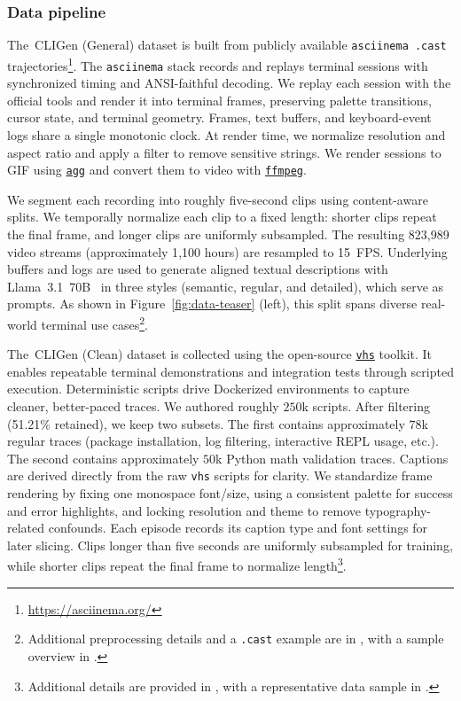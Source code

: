 \subsubsection{Data pipeline}

The \cligenGeneralLogo{}\,CLIGen (General) dataset is built from publicly available \texttt{asciinema .cast} trajectories\footnote{\url{https://asciinema.org/}}.
The \texttt{asciinema} stack records and replays terminal sessions with synchronized timing and ANSI-faithful decoding.
We replay each session with the official tools and render it into terminal frames, preserving palette transitions, cursor state, and terminal geometry.
Frames, text buffers, and keyboard-event logs share a single monotonic clock.
At render time, we normalize resolution and aspect ratio and apply a filter to remove sensitive strings.
We render sessions to GIF using \href{https://github.com/asciinema/agg}{\texttt{agg}} and convert them to video with \href{https://github.com/FFmpeg/FFmpeg}{\texttt{ffmpeg}}.

We segment each recording into roughly five-second clips using content-aware splits. 
We temporally normalize each clip to a fixed length: shorter clips repeat the final frame, and longer clips are uniformly subsampled. 
The resulting 823{,}989 video streams (approximately 1{,}100 hours) are resampled to 15~FPS.
Underlying buffers and logs are used to generate aligned textual descriptions with Llama~3.1~70B~\citep{dubey2024llama} in three styles (semantic, regular, and detailed), which serve as prompts.
As shown in Figure~\ref{fig:data-teaser} (left), this split spans diverse real-world terminal use cases\footnote{Additional preprocessing details and a \texttt{.cast} example are in , with a sample overview in .}.

The \cligenCleanLogo{}\,CLIGen (Clean) dataset is collected using the open-source \href{https://github.com/charmbracelet/vhs}{\texttt{vhs}} toolkit.
It enables repeatable terminal demonstrations and integration tests through scripted execution.
Deterministic scripts drive Dockerized environments to capture cleaner, better-paced traces.
We authored roughly $250$k scripts.
After filtering (51.21\% retained), we keep two subsets.
The first contains approximately $78$k regular traces (package installation, log filtering, interactive REPL usage, etc.).
The second contains approximately $50$k Python math validation traces.
Captions are derived directly from the raw \texttt{vhs} scripts for clarity.
We standardize frame rendering by fixing one monospace font/size, using a consistent palette for success and error highlights, and locking resolution and theme to remove typography-related confounds.
Each episode records its caption type and font settings for later slicing.
Clips longer than five seconds are uniformly subsampled for training, while shorter clips repeat the final frame to normalize length\footnote{Additional details are provided in , with a representative data sample in .}.

